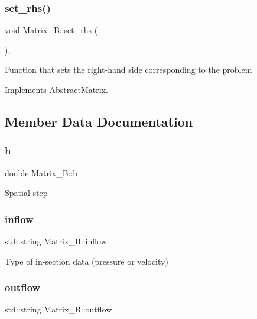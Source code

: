 \subsubsection{\texorpdfstring{set\+\_\+rhs()}{set\_rhs()}}
{\footnotesize\ttfamily void Matrix\+\_\+\+B\+::set\+\_\+rhs (\begin{DoxyParamCaption}{ }\end{DoxyParamCaption})\hspace{0.3cm}{\ttfamily [override]}, {\ttfamily [virtual]}}

Function that sets the right-\/hand side corresponding to the problem 

Implements \hyperlink{classAbstractMatrix_a1334661de25f76dc65f16538c167a03c}{Abstract\+Matrix}.



\subsection{Member Data Documentation}
\mbox{\label{classMatrix__B_ad45ceefd12c2c4221943b5e92bafcee5}} 
\subsubsection{\texorpdfstring{h}{h}}
{\footnotesize\ttfamily double Matrix\+\_\+\+B\+::h\hspace{0.3cm}{\ttfamily [private]}}

Spatial step \mbox{\label{classMatrix__B_aa09ba2dc48bc7ad46d5e0e7bb70d43da}} 
\subsubsection{\texorpdfstring{inflow}{inflow}}
{\footnotesize\ttfamily std\+::string Matrix\+\_\+\+B\+::inflow\hspace{0.3cm}{\ttfamily [private]}}

Type of in-\/section data (pressure or velocity) \mbox{\label{classMatrix__B_a447ea580c1b63f7e3984cedbb217c61c}} 
\subsubsection{\texorpdfstring{outflow}{outflow}}
{\footnotesize\ttfamily std\+::string Matrix\+\_\+\+B\+::outflow\hspace{0.3cm}{\ttfamily [private]}}


